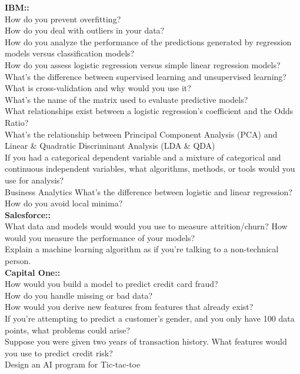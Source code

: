 \documentclass[11pt]{article}
\begin{document}
{\bf IBM:: }\\
How do you prevent overfitting?\\
How do you deal with outliers in your data?\\
How do you analyze the performance of the predictions generated by regression models versus classification models?\\
How do you assess logistic regression versus simple linear regression models?\\
What’s the difference between supervised learning and unsupervised learning?\\
What is cross-validation and why would you use it?\\
What’s the name of the matrix used to evaluate predictive models?\\
What relationships exist between a logistic regression’s coefficient and the Odds Ratio?\\
What’s the relationship between Principal Component Analysis (PCA) and Linear \& Quadratic Discriminant Analysis (LDA \& QDA) \\
If you had a categorical dependent variable and a mixture of categorical and continuous independent variables, what algorithms, methods, or tools would you use for analysis?\\
Business Analytics What’s the difference between logistic and linear regression? How do you avoid local minima?\\

{\bf Salesforce:: }\\
What data and models would would you use to measure attrition/churn? How would you measure the performance of your models?\\
Explain a machine learning algorithm as if you’re talking to a non-technical person. \\

{\bf Capital One:: }\\
How would you build a model to predict credit card fraud?\\
How do you handle missing or bad data?\\
How would you derive new features from features that already exist?\\
If you’re attempting to predict a customer’s gender, and you only have 100 data points, what problems could arise?\\
Suppose you were given two years of transaction history. What features would you use to predict credit risk?\\
Design an AI program for Tic-tac-toe \\
\end{document}
